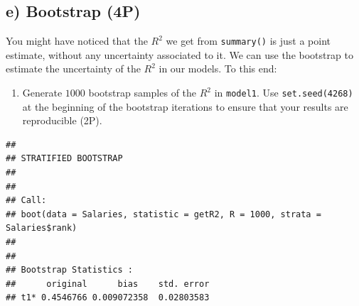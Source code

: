 \documentclass[
]{article}
\newenvironment{Shaded}{\begin{snugshade}}{\end{snugshade}}
\newcommand{\AttributeTok}[1]{\textcolor[rgb]{0.77,0.63,0.00}{#1}}
\newcommand{\CommentTok}[1]{\textcolor[rgb]{0.56,0.35,0.01}{\textit{#1}}}
\newcommand{\ControlFlowTok}[1]{\textcolor[rgb]{0.13,0.29,0.53}{\textbf{#1}}}
\newcommand{\DecValTok}[1]{\textcolor[rgb]{0.00,0.00,0.81}{#1}}
\newcommand{\FunctionTok}[1]{\textcolor[rgb]{0.00,0.00,0.00}{#1}}
\newcommand{\NormalTok}[1]{#1}
\newcommand{\OtherTok}[1]{\textcolor[rgb]{0.56,0.35,0.01}{#1}}
\newcommand{\SpecialCharTok}[1]{\textcolor[rgb]{0.00,0.00,0.00}{#1}}
\providecommand{\tightlist}{%
  \setlength{\itemsep}{0pt}\setlength{\parskip}{0pt}}
\begin{document}
\hypertarget{e-bootstrap-4p}{%
\subsection{e) Bootstrap (4P)}\label{e-bootstrap-4p}}

You might have noticed that the \(R^2\) we get from \texttt{summary()}
is just a point estimate, without any uncertainty associated to it. We
can use the bootstrap to estimate the uncertainty of the \(R^2\) in our
models. To this end:

\begin{enumerate}
\def\labelenumi{(\roman{enumi})}
\tightlist
\item
  Generate \(1000\) bootstrap samples of the \(R^2\) in \texttt{model1}.
  Use \texttt{set.seed(4268)} at the beginning of the bootstrap
  iterations to ensure that your results are reproducible (2P).
\end{enumerate}

\begin{Shaded}
\end{Shaded}

\begin{verbatim}
## 
## STRATIFIED BOOTSTRAP
## 
## 
## Call:
## boot(data = Salaries, statistic = getR2, R = 1000, strata = Salaries$rank)
## 
## 
## Bootstrap Statistics :
##      original      bias    std. error
## t1* 0.4546766 0.009072358  0.02803583
\end{verbatim}
\end{document}
